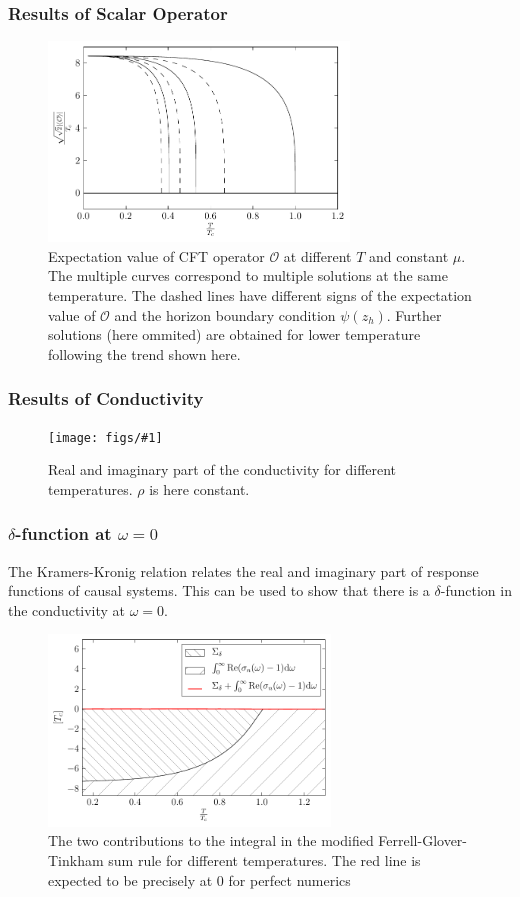 \documentclass{beamer}
\newcommand{\fig}[2]{
\begin{figure}
\centering
\texttt{[image: figs/\#1]}
\caption{#2}
\end{figure}
}
\begin{document}
\begin{frame}
\frametitle{Results of Scalar Operator}
\begin{figure}
\centering
\includegraphics[width=8cm]{figs/O_constRho_a2_0.0.pdf}
\caption{Expectation value of CFT operator $\mathcal{O}$ at different $T$ and constant $\mu$. The multiple curves correspond to multiple solutions at the same temperature. The dashed lines have different signs of the expectation value of $\mathcal{O}$ and the horizon boundary condition $\psi(z_h)$. Further solutions (here ommited) are obtained for lower temperature following the trend shown here.}
\end{figure}
\end{frame}


\begin{frame}
\frametitle{Results of Conductivity}
\fig{cond_Ts_a2_0.0_v2.pdf}{Real and imaginary part of the conductivity for different temperatures. $\rho$ is here constant.\label{f:cond}}
\end{frame}

\begin{frame}
\frametitle{$\delta$-function at $\omega=0$}
The Kramers-Kronig relation relates the real and imaginary part of response functions of causal systems. This can be used to show that there is a $\delta$-function in the conductivity at $\omega=0$.
\begin{figure}
\centering
\includegraphics[width=7.5cm]{figs/sum_rule_a20}
\caption{The two contributions to the integral in the modified Ferrell-Glover-Tinkham sum rule for different temperatures. The red line is expected to be precisely at 0 for perfect numerics}
\end{figure}
\end{frame}
\end{document}
